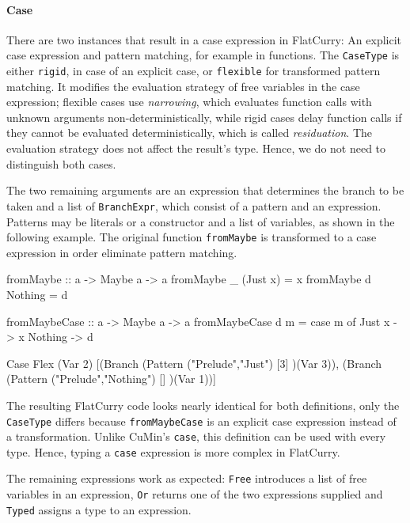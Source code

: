 \documentclass[paper = a4, fleqn, abstract=on, twoside]{scrreprt}
\newcommand{\todo}[1]{\marginpar{\textbf{TODO:} #1}}
\newcommand{\coqinline}[1]{\texttt{#1}}
\begin{document}
\paragraph{Case}
There are two instances that result in a case expression in FlatCurry: An explicit case expression and pattern matching, for example in functions. The \coqinline{CaseType} is either \coqinline{rigid}, in case of an explicit case, or \coqinline{flexible} for transformed pattern matching. It modifies the evaluation strategy of free variables in the case expression; flexible cases use \textit{narrowing}, which evaluates function calls with unknown arguments non-deterministically, while rigid cases delay function calls if they cannot be evaluated deterministically, which is called \textit{residuation}.\cite{Hanus13} \todo{Stimmt das?}
The evaluation strategy does not affect the result's type. Hence, we do not need to distinguish both cases.
\par
The two remaining arguments are an expression that determines the branch to be taken and a list of \coqinline{BranchExpr}, which consist of a pattern and an expression. Patterns may be literals or a constructor and a list of variables, as shown in the following example. The original function \texttt{fromMaybe} is transformed to a case expression in order eliminate pattern matching.\\
\par
\begin{minipage}[t]{.5\linewidth}
\begin{haskellcode}
fromMaybe :: a -> Maybe a -> a
fromMaybe _ (Just x) = x
fromMaybe d Nothing  = d
\end{haskellcode}
\end{minipage}
\begin{minipage}[t]{.5\linewidth}
\begin{haskellcode}
fromMaybeCase :: a -> Maybe a -> a
fromMaybeCase d m = case m of
                      Just x  -> x
                      Nothing -> d
\end{haskellcode}
\end{minipage}
\begin{coqcode}
Case Flex (Var 2) [(Branch (Pattern ("Prelude","Just") [3] )(Var 3)),
                   (Branch (Pattern ("Prelude","Nothing") [] )(Var 1))]
\end{coqcode}
The resulting FlatCurry code looks nearly identical for both definitions, only the \coqinline{CaseType} differs because \texttt{fromMaybeCase} is an explicit case expression instead of a transformation. Unlike CuMin's \texttt{case}, this definition can be used with every type. Hence, typing a \texttt{case} expression is more complex in FlatCurry.\\
\par
The remaining expressions work as expected: \texttt{Free} introduces a list of free variables in an expression, \texttt{Or} returns one of the two expressions supplied and \texttt{Typed} assigns a type to an expression. \todo{Weglassen?}
\end{document}
